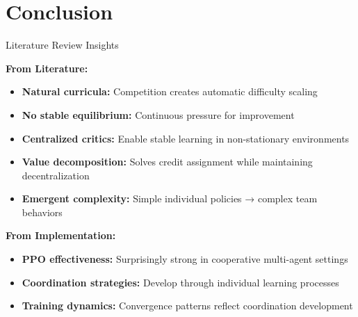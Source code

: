 \documentclass[aspectratio=169]{beamer}
\begin{document}
\section{Conclusion}

\begin{frame}{Literature Review Insights}
    
    \textbf{From Literature:}
    \begin{itemize}
        \item \textbf{Natural curricula:} Competition creates automatic difficulty scaling
        \item \textbf{No stable equilibrium:} Continuous pressure for improvement
        \item \textbf{Centralized critics:} Enable stable learning in non-stationary environments
        \item \textbf{Value decomposition:} Solves credit assignment while maintaining decentralization
        \item \textbf{Emergent complexity:} Simple individual policies → complex team behaviors
    \end{itemize}
    
    \vfill
    
    \textbf{From Implementation:}
    \begin{itemize}
        \item \textbf{PPO effectiveness:} Surprisingly strong in cooperative multi-agent settings
        \item \textbf{Coordination strategies:} Develop through individual learning processes
        \item \textbf{Training dynamics:} Convergence patterns reflect coordination development
    \end{itemize}
\end{frame}
\end{document}
